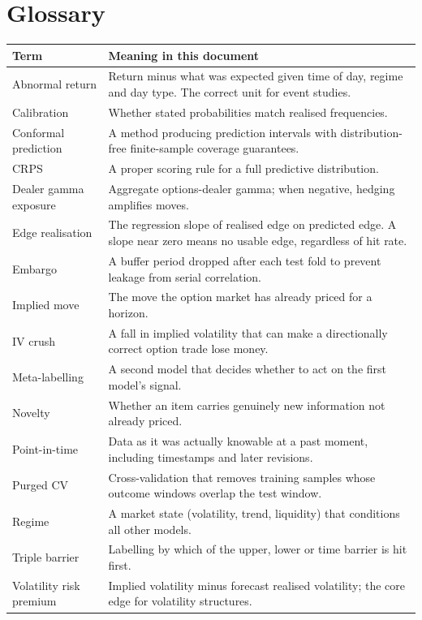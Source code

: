 \chapter{Glossary}

\begin{longtable}{@{}p{3.8cm}p{10.8cm}@{}}
\toprule
\textbf{Term} & \textbf{Meaning in this document}\\
\midrule
Abnormal return & Return minus what was expected given time of day, regime and
day type. The correct unit for event studies.\\
Calibration & Whether stated probabilities match realised frequencies.\\
Conformal prediction & A method producing prediction intervals with
distribution-free finite-sample coverage guarantees.\\
CRPS & A proper scoring rule for a full predictive distribution.\\
Dealer gamma exposure & Aggregate options-dealer gamma; when negative, hedging
amplifies moves.\\
Edge realisation & The regression slope of realised edge on predicted edge.
A slope near zero means no usable edge, regardless of hit rate.\\
Embargo & A buffer period dropped after each test fold to prevent leakage from
serial correlation.\\
Implied move & The move the option market has already priced for a horizon.\\
IV crush & A fall in implied volatility that can make a directionally correct
option trade lose money.\\
Meta-labelling & A second model that decides whether to act on the first
model's signal.\\
Novelty & Whether an item carries genuinely new information not already priced.\\
Point-in-time & Data as it was actually knowable at a past moment, including
timestamps and later revisions.\\
Purged CV & Cross-validation that removes training samples whose outcome windows
overlap the test window.\\
Regime & A market state (volatility, trend, liquidity) that conditions all other
models.\\
Triple barrier & Labelling by which of the upper, lower or time barrier is hit
first.\\
Volatility risk premium & Implied volatility minus forecast realised volatility;
the core edge for volatility structures.\\
\bottomrule
\end{longtable}

